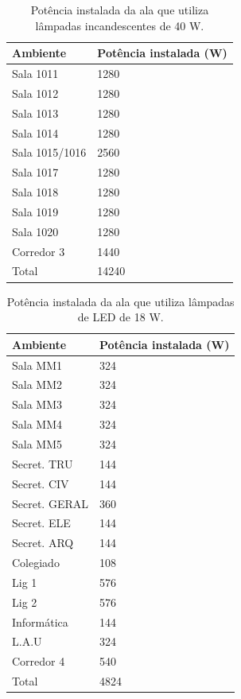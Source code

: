 \begin{table}[H]
\centering
\caption{Potência instalada da ala que utiliza lâmpadas incandescentes de 40 W.}
\label{tab_40w}
\begin{tabular}{ll}\hline  
Ambiente       & Potência instalada (W) \\\hline  
Sala 1011      & 1280                   \\
Sala 1012      & 1280                   \\
Sala 1013      & 1280                   \\
Sala 1014      & 1280                   \\
Sala 1015/1016 & 2560                   \\
Sala 1017      & 1280                   \\
Sala 1018      & 1280                   \\
Sala 1019      & 1280                   \\
Sala 1020      & 1280                   \\
Corredor 3     & 1440                   \\\hline  
Total          & 14240  \\\hline                 
\end{tabular}
\end{table}

\begin{table}[H]
\centering
\caption{Potência instalada da ala que utiliza lâmpadas de LED de 18 W.}
\label{tab_led}
\begin{tabular}{ll}\hline  
Ambiente      & Potência instalada (W) \\\hline  
Sala MM1      & 324                    \\
Sala MM2      & 324                    \\
Sala MM3      & 324                    \\
Sala MM4      & 324                    \\
Sala MM5      & 324                    \\
Secret. TRU   & 144                    \\
Secret. CIV   & 144                    \\
Secret. GERAL & 360                    \\
Secret. ELE   & 144                    \\
Secret. ARQ   & 144                    \\
Colegiado     & 108                    \\
Lig 1         & 576                    \\
Lig 2         & 576                    \\
Informática   & 144                    \\
L.A.U         & 324                    \\
Corredor 4    & 540                    \\\hline  
Total         & 4824      \\\hline              
\end{tabular}
\end{table}

